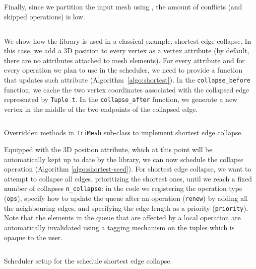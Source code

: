 Finally, since we partition the input mesh using  \cite{karras2012maximizing}, the amount of conflicts (and skipped operations) is low.



\subsection{}

We show how the library is used in a classical example, shortest edge collapse. In this case, we add a 3D position to every vertex as a vertex attribute (by default, there are no attributes attached to mesh elements). For every attribute and for every operation we plan to use in the scheduler, we need to provide a function that updates such attribute (Algorithm~\ref{algo:shortest}). In the \texttt{collapse\_before} function, we cache the two vertex coordinates associated with the collapsed edge represented by \texttt{Tuple t}. In the \texttt{collapse\_after} function, we generate a new vertex in the middle of the two endpoints of the collapsed edge. %

\begin{algorithm}
\inputminted{cpp}{wmtk-tex/code/shortest.cpp}
\caption{Overridden methods in \texttt{TriMesh} sub-class to implement shortest edge collapse.}
\label{algo:shortest}
\end{algorithm}

Equipped with the 3D position attribute, which at this point will be automatically kept up to date by the library, we can now schedule the collapse operation (Algorithm \ref{algo:shortest-sced}). For shortest edge collapse, we want to attempt to collapse all edges, prioritizing the shortest ones, until we reach a fixed number of collapses \texttt{n\_collapse}: in the code we registering the operation type (\texttt{ops}), specify how to update the queue after an operation (\texttt{renew}) by adding all the neighbouring edges, and specifying the edge length as a priority (\texttt{priority}). Note that the  elements in the queue that are affected by a local operation are automatically invalidated using a tagging mechanism on the tuples which is opaque to the user.

\begin{algorithm}
\inputminted{cpp}{wmtk-tex/code/shortest-sched.cpp}
\caption{Scheduler setup for the schedule shortest edge collapse.}
\label{algo:shortest-sced}
\end{algorithm}